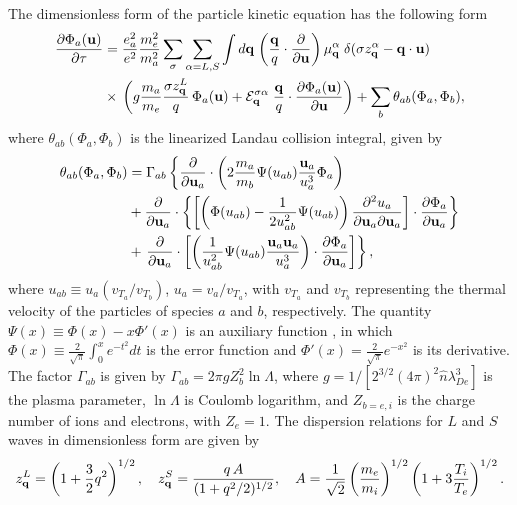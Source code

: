 \documentclass[12pt,a4paper,ruledheader]{report}
\def\calE{{\cal E}}
\begin{document}
The dimensionless form of the particle kinetic equation has the
following form
\begin{equation}
  \begin{split}
    \frac{\partial \Phi_a({\bf u})}{\partial \tau}
    &= \frac{e_a^2}{e^2}\frac{m_e^2}{m_a^2}
    \sum_\sigma\sum_{\alpha=L,S}\int d{\bf q}\;\biggl(\frac{\bf q}{q}
    \cdot\frac{\partial}{\partial{\bf u}}\biggr)\,\mu_{\bf q}^\alpha
    \;\delta(\sigma z_{\bf q}^\alpha-{\bf q}\cdot{\bf u})\\
    & \times\,\biggl(g\frac{m_a}{m_e}\frac{\sigma z_{\bf q}^L}{q}
    \,\Phi_a({\bf u})+\calE_{\bf q}^{\sigma\alpha}
    \;\frac{\bf q}{q}\cdot\frac{\partial \Phi_a({\bf u})}
    {\partial{\bf u}}\biggr)+\sum_b\theta_{ab}(\Phi_a,\Phi_b),
    \label{Feu-evol}
  \end{split}
\end{equation}
where $\theta_{ab}(\Phi_a,\Phi_b)$ is the linearized Landau
collision integral, given by
\begin{equation}
  \begin{split}
     \theta_{ab}(\Phi_a,\Phi_b) &= \Gamma_{ab}\left\{
     \frac{\partial}{\partial{\bf u}_a}\cdot
     \left(2\frac{m_a}{m_b}\Psi(u_{ab})
     \frac{{\bf u}_a}{u^3_a}\Phi_a\right)\right.\\
  &+\frac{\partial}{\partial{\bf u}_a}\cdot
     \left\{\left[\left(\Phi(u_{ab})
     -\frac{1}{2 u_{ab}^2}\Psi(u_{ab})\right)
     \frac{\partial^2u_a}{\partial{\bf u}_a
     \partial{\bf u}_a}\right]\cdot
     \frac{\partial \Phi_a}{\partial{\bf u}_a}\right\}
    \label{eq:coll-lin} \\
  &+\left. \frac{\partial}{\partial{\bf u}_a}\cdot
     \left[\left(\frac{1}{u_{ab}^2}\Psi(u_{ab})
     \frac{{\bf u}_a{\bf u}_a}{u_a^3}\right)\cdot
   \frac{\partial \Phi_a}{\partial{\bf u}_a}\right]\right\},
\end{split}
\end{equation}
where $u_{ab}\equiv u_a (v_{T_a}/v_{T_b})$, $u_a=v_a/v_{T_a}$,
with $v_{T_a}$ and $v_{T_b}$ representing the thermal velocity of
the particles of species $a$ and $b$, respectively. The quantity
$\Psi(x)\equiv\Phi(x)-x\Phi'(x)$ is an auxiliary function \cite{
  Gaffey1976}, in which $\Phi(x) \equiv \frac{2}{\sqrt{\pi}}
\int_0^x e^{-t^2}dt$ is the error function and $\Phi'(x)=
\frac{2}{\sqrt{\pi}}e^{-x^2}$ is its derivative. The factor
$\Gamma_{ab}$ is given by $\Gamma_{ab}=2\pi g Z_b^2 \ln\Lambda $,
where $g=1/[2^{3/2}(4\pi)^2\hat n \lambda_{De}^3]$ is the plasma
parameter, $\ln \Lambda$ is Coulomb logarithm, and $Z_{b=e,i}$ is
the charge number of ions and electrons, with $Z_e=1$.
The dispersion relations for $L$ and $S$ waves in dimensionless
form are given by
\begin{eqnarray*}
  z_{\bf q}^L = \left(1+\frac{3}{2}q^2\right)^{1/2},
 \quad   z_{\bf q}^S = \frac{q\, A}{(1+q^2/2)^{1/2}}, \quad
    A= \frac{1}{\sqrt{2}} \left(\frac{m_e}{m_i}\right)^{1/2}
     \left(1+3\frac{T_i}{T_e}\right)^{1/2}.
\end{eqnarray*}
\end{document}
